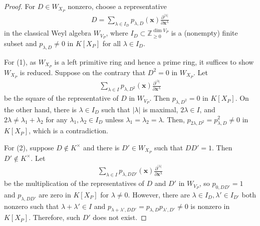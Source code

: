 \documentclass[11pt,a4paper,usenames,dvipsnames,reqno]{amsart}
\numberwithin{equation}{section}
\newcommand{\zz}{\mathbb Z}
\theoremstyle{definition}
\theoremstyle{remark}
\begin{document}
\begin{proof}
For $D\in W_{X_P}$ nonzero, choose a representative
\begin{align*}
    D=\sum_{\lambda\in I_D} p_{\lambda,D}(\mathbf{x}) \frac{\partial^{|\lambda|}}{\partial \mathbf{x}^\lambda}
\end{align*}
in the classical Weyl algebra $W_{V_P}$, where $I_D\subset \zz_{\ge 0}^{\dim V_P}$ is a (nonempty) finite subset and $p_{\lambda,D }\neq 0$ in $K[X_P]$ for all $\lambda\in I_D$.

For (1), as $W_{X_P}$ is a left primitive ring and hence a prime ring, it suffices to show $W_{X_P}$ is reduced. Suppose on the contrary that $D^2=0$ in $W_{X_P}$. Let
\begin{align*}
    \sum_{\lambda\in I} p_{\lambda,D^2}(\mathbf{x})\frac{\partial^{|\lambda|}}{\partial \mathbf{x}^\lambda}
\end{align*}
be the square of the representative of $D$ in $W_{V_P}$. Then $p_{\lambda,D^2}=0$ in $K[X_P]$. On the other hand, there is $\lambda\in I_D$ such that $|\lambda|$ is maximal, $2\lambda\in I$, and $2\lambda\neq \lambda_1+\lambda_2$ for any $\lambda_1,\lambda_2\in I_D$ unless $\lambda_1=\lambda_2=\lambda$.
Then, $p_{2\lambda, D^2}=p_{\lambda,D}^2\neq 0$ in $K[X_P]$, which is a contradiction.




For (2), suppose $D\not\in K^\times$ and there is $D'\in W_{X_P}$ such that $DD'=1$. Then $D'\not\in K^\times.$ Let
\begin{align*}
    \sum_{\lambda\in I} p_{\lambda,DD'}(\mathbf{x})\frac{\partial^{|\lambda|}}{\partial \mathbf{x}^\lambda}
\end{align*}
be the multiplication of the representatives of $D$ and $D'$ in $W_{V_P}$, so $p_{0,DD'}=1$ and  $p_{\lambda,DD'}$ are zero in $K[X_P]$ for $\lambda\neq 0$. However, there are $\lambda\in I_D,\lambda'\in I_{D'}$ both nonzero such that $\lambda+\lambda'\in I$ and   $p_{\lambda+\lambda',DD'}=p_{\lambda,D}p_{\lambda',D'}\neq 0$
is nonzero in $K[X_P]$. Therefore, such $D'$ does not exist. 


\end{proof}
\end{document}
